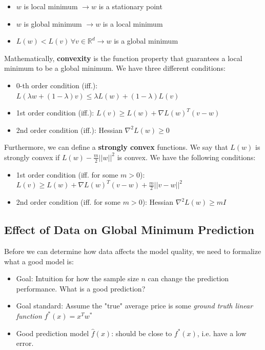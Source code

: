 \documentclass[a4paper]{extarticle}
\begin{document}
\begin{itemize}
    \item \(w\) is local minimum \(\rightarrow w\) is a stationary point
    \item \(w\) is global minimum \(\rightarrow w\) is a local minimum
    \item \(L(w) < L(v) \, \forall v \in \mathbb{R}^d \rightarrow w\) is a global minimum
\end{itemize}

Mathematically, \textbf{convexity} is the function property that guarantees a local minimum to be a global minimum. We have three different conditions:

\begin{itemize}
    \item 0-th order condition (iff.): \(L(\lambda w + (1 - \lambda)v) \leq \lambda L(w) + (1 - \lambda)L(v)\)
    \item 1st order condition (iff.): \(L(v) \geq L(w) + \nabla L(w)^T(v-w)\)
    \item 2nd order condition (iff.): Hessian \(\nabla^2L(w) \geq 0\)
\end{itemize}

Furthermore, we can define a \textbf{strongly convex} functions. We say that \(L(w)\) is strongly convex if \(L(w) - \frac{m}{2}||w||^2\) is convex. We have the following conditions:

\begin{itemize}
    \item 1st order condition (iff. for some \(m > 0\)): \(L(v) \geq L(w) + \nabla L(w)^T(v-w) + \frac{m}{2}||v-w||^2\)
    \item 2nd order condition (iff. for some \(m > 0\)): Hessian \(\nabla^2L(w) \geq mI\)
\end{itemize}

\subsection{Effect of Data on Global Minimum Prediction}

Before we can determine how data affects the model quality, we need to formalize what a good model is:

\begin{itemize}
    \item Goal: Intuition for how the sample size \(n\) can change the prediction performance. What is a good prediction?
    \item Goal standard: Assume the "true" average price is some \textit{ground truth linear function} \(f^*(x) = x^Tw^*\)
    \item Good prediction model \(\hat{f}(x)\): should be close to \(f^*(x)\), i.e. have a low error.
\end{itemize}
\end{document}
